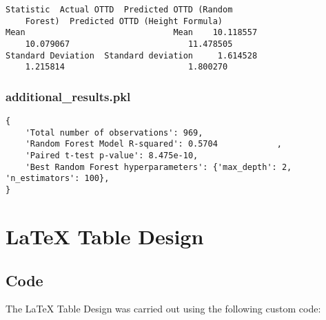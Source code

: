 \documentclass[11pt]{article}
\begin{document}
\begin{Verbatim}[tabsize=4]
                             Statistic  Actual OTTD  Predicted OTTD (Random
	Forest)  Predicted OTTD (Height Formula)
Mean                              Mean    10.118557
	10.079067                        11.478505
Standard Deviation  Standard deviation     1.614528
	1.215814                         1.800270
\end{Verbatim}

\subsubsection*{additional\_results.pkl}

\begin{Verbatim}[tabsize=4]
{
    'Total number of observations': 969,
    'Random Forest Model R-squared': 0.5704            ,
    'Paired t-test p-value': 8.475e-10,
    'Best Random Forest hyperparameters': {'max_depth': 2, 'n_estimators': 100},
}
\end{Verbatim}

\section{LaTeX Table Design}
\subsection{{Code}}
The LaTeX Table Design was carried out using the following custom code:
\end{document}
